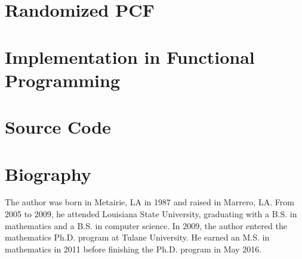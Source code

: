 \documentclass[10pt]{TUT}
\begin{document}
\chapter{Randomized PCF}\label{chap:semantics}


\chapter{Implementation in Functional Programming}
\label{chap:func}



\appendix
\chapter{Source Code}


\renewcommand\bibname{References}



%



\chapter*{Biography}

The author was born in Metairie, LA in 1987 and raised in Marrero, LA.  From 2005 to 2009, he attended Louisiana State University, graduating with a B.S. in mathematics and a B.S. in computer science.  In 2009, the author entered the mathematics Ph.D. program at Tulane University.  He earned an M.S. in mathematics in 2011 before finishing the Ph.D. program in May 2016. 
\end{document}
